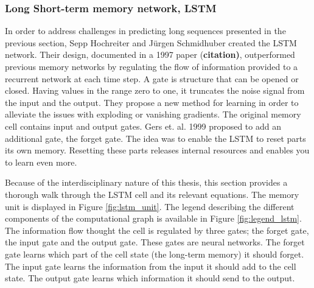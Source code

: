 \subsubsection{Long Short-term memory network, LSTM} \label{sec:lstm}
In order to address challenges in predicting long sequences presented in the previous section, Sepp Hochreiter and Jürgen Schmidhuber created the LSTM network. Their design, documented in a 1997 paper (\textbf{citation)}, outperformed previous memory networks by regulating the flow of information provided to a recurrent network at each time step.
A gate is structure that can be opened or closed. Having values in the range zero to one, it truncates the noise signal from the input and the output. They propose a new method for learning %
in order to alleviate the issues with exploding or vanishing gradients. The original memory cell contains input and output gates. Gers et. al. 1999 proposed to add an additional gate, the forget gate. The idea was to enable the LSTM to reset parts its own memory. Resetting these parts releases internal resources and enables you to learn even more. 

Because of the interdisciplinary nature of this thesis, this section provides a thorough walk through the LSTM cell and its relevant equations. The memory unit is displayed in Figure \ref{fig:lstm_unit}. The legend describing the different components of the computational graph is available in Figure \ref{fig:legend_lstm}. The information flow thought the cell is regulated by three gates; the forget gate, the input gate and the output gate. These gates are neural networks. The forget gate learns which part of the cell state (the long-term memory) it should forget. The input gate learns the information from the input it should add to the cell state. The output gate learns which information it should send to the output. 

